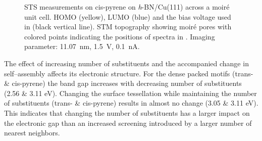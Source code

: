 \begin{figure}[] \centering
	\caption{ STS measurements on cis-pyrene on \textit{h}-BN/Cu(111) across a moir\'e unit cell. HOMO (yellow), LUMO (blue) and the bias voltage used in  (black vertical line).  STM topography showing moir\'e pores with colored points indicating the positions of spectra in . Imaging parameter: \SI{11.07}{\nano \meter}, \SI{1.5}{\volt}, \SI{0.1}{\nano \ampere}.
	}
	\label{fig:pyrene-fig8}
\end{figure}

The effect of increasing number of substituents and the accompanied change in self–assembly affects its electronic structure. For the dense packed motifs (trans- \& cis-pyrene) the band gap increases with decreasing number of substituents (2.56 \& 3.11 eV). Changing the surface tessellation while maintaining the number of substituents (trans- \& cis-pyrene) results in almost no change (3.05 \& 3.11 eV). This indicates that changing the number of substituents has a larger impact on the electronic gap than an increased screening introduced by a larger number of nearest neighbors.

